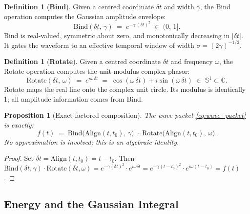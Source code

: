 \documentclass[11pt,a4paper]{article}
\newtheorem{proposition}[theorem]{Proposition}
\theoremstyle{definition}
\newtheorem{definition}[theorem]{Definition}
\begin{document}
\begin{definition}[\textbf{Bind}]
  \label{def:bind}
  Given a centred coordinate $\delta t$ and width $\gamma$, the
  Bind operation computes the Gaussian amplitude envelope:
  \begin{equation}
    \mathrm{Bind}(\delta t,\, \gamma)
    \;=\; e^{-\gamma\,(\delta t)^2}
    \;\in\; (0,\,1].
    \label{eq:bind}
  \end{equation}
  Bind is real-valued, symmetric about zero, and monotonically
  decreasing in $|\delta t|$.  It gates the waveform to an effective
  temporal window of width $\sigma = (2\gamma)^{-1/2}$.
\end{definition}

\begin{definition}[\textbf{Rotate}]
  \label{def:rotate}
  Given a centred coordinate $\delta t$ and frequency $\omega$, the
  Rotate operation computes the unit-modulus complex phasor:
  \begin{equation}
    \mathrm{Rotate}(\delta t,\, \omega)
    \;=\; e^{i\omega\,\delta t}
    \;=\; \cos(\omega\,\delta t) + i\sin(\omega\,\delta t)
    \;\in\; \mathbb{S}^1 \subset \mathbb{C}.
    \label{eq:rotate}
  \end{equation}
  Rotate maps the real line onto the complex unit circle.
  Its modulus is identically 1; all amplitude information comes
  from Bind.
\end{definition}

\begin{proposition}[Exact factored composition]
  \label{prop:composition}
  The wave packet \eqref{eq:wave_packet} is exactly:
  \begin{equation}
    f(t)
    \;=\;
    \mathrm{Bind}\!\bigl(\mathrm{Align}(t,t_0),\,\gamma\bigr)
    \;\cdot\;
    \mathrm{Rotate}\!\bigl(\mathrm{Align}(t,t_0),\,\omega\bigr).
    \label{eq:composition}
  \end{equation}
  No approximation is involved; this is an algebraic identity.
\end{proposition}

\begin{proof}
  Set $\delta t = \mathrm{Align}(t,t_0) = t - t_0$.  Then
  $\mathrm{Bind}(\delta t,\gamma) \cdot \mathrm{Rotate}(\delta t,\omega)
  = e^{-\gamma(\delta t)^2} \cdot e^{i\omega\delta t}
  = e^{-\gamma(t-t_0)^2} \cdot e^{i\omega(t-t_0)} = f(t)$.
\end{proof}

\subsection{Energy and the Gaussian Integral}
\end{document}
